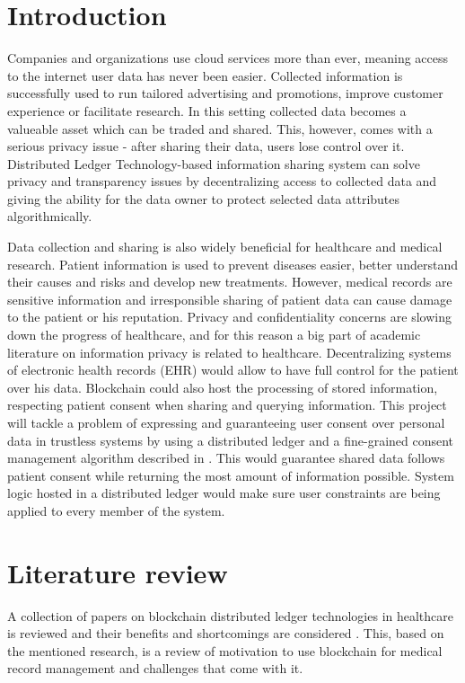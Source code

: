 \documentclass[12pt]{article}
\begin{document}
    \newpage
    \tableofcontents

    \newpage
    \section{Introduction}
    Companies and organizations use cloud services more than ever, meaning access to the internet user data has never been easier. Collected information is successfully used to run tailored advertising and promotions, improve customer experience or facilitate research. In this setting collected data becomes a valueable asset which can be traded and shared. This, however, comes with a serious privacy issue - after sharing their data, users lose control over it. Distributed Ledger Technology-based information sharing system can solve privacy and transparency issues by decentralizing access to collected data and giving the ability for the data owner to protect selected data attributes algorithmically.

    Data collection and sharing is also widely beneficial for healthcare and medical research. Patient information is used to prevent diseases easier, better understand their causes and risks and develop new treatments. However, medical records are sensitive information and irresponsible sharing of patient data can cause damage to the patient or his reputation. Privacy and confidentiality concerns are slowing down the progress of healthcare, and for this reason a big part of academic literature on information privacy is related to healthcare. Decentralizing systems of electronic health records (EHR) would allow to have full control for the patient over his data. Blockchain could also host the processing of stored information, respecting patient consent when sharing and querying information. This project will tackle a problem of expressing and guaranteeing user consent over personal data in trustless systems by using a distributed ledger and a fine-grained consent management algorithm described in \cite{konstantinidis}. This would guarantee shared data follows patient consent while returning the most amount of information possible. System logic hosted in a distributed ledger would make sure user constraints are being applied to every member of the system.

    \section{Literature review}
    A collection of papers on blockchain distributed ledger technologies in healthcare is reviewed and their benefits and shortcomings are considered \cite{dlt}. This, based on the mentioned research, is a review  of motivation to use blockchain for medical record management and challenges that come with it.
\end{document}
